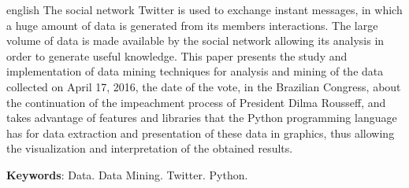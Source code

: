 \begin{resumo}[ABSTRACT]
 \begin{otherlanguage*}{english}
The social network Twitter is used to exchange instant messages, in which a huge amount of data is generated from its members interactions. The large volume of data is made available by the social network allowing its analysis in order to generate useful knowledge. This paper presents the study and implementation of data mining techniques for analysis and mining of the data collected on April 17, 2016, the date of the vote, in the Brazilian Congress, about the continuation of the impeachment process of President Dilma Rousseff, and takes advantage of features and libraries that the Python programming language has for data extraction and presentation of these data in graphics, thus allowing the visualization and interpretation of the obtained results.
   
   \vspace{\onelineskip}
 
   \noindent 
   \textbf{Keywords}: Data. Data Mining. Twitter. Python.
 \end{otherlanguage*}
\end{resumo}
